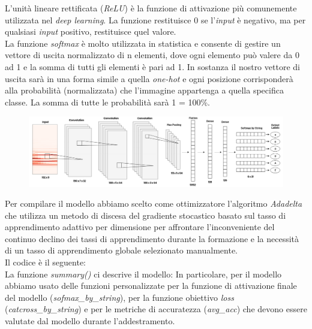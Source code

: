 L'unità lineare rettificata (\textit{ReLU}) è la funzione di attivazione più comunemente utilizzata nel \textit{deep learning}. La funzione restituisce 0 se l'\textit{input} è negativo, ma per qualsiasi \textit{input} positivo, restituisce quel valore.\\
La funzione \textit{softmax} è molto utilizzata in statistica e consente di gestire un vettore di uscita normalizzato di n elementi, dove ogni elemento può valere da 0 ad 1 e la somma di tutti gli elementi è pari ad 1. In sostanza il nostro vettore di uscita sarà in una forma simile a quella \textit{one-hot} e ogni posizione corrisponderà alla probabilità (normalizzata) che l’immagine appartenga a quella specifica classe. La somma di tutte le probabilità sarà 1 = 100\%.
\begin{figure}[H]
	\centering
	\includegraphics[scale=1.4]{./images/model.png}
\end{figure}
\noindent Per compilare il modello abbiamo scelto come ottimizzatore l'algoritmo \textit{Adadelta} che utilizza un metodo di discesa del gradiente stocastico basato sul tasso di apprendimento adattivo per dimensione per affrontare l'inconveniente del continuo declino dei tassi di apprendimento durante la formazione e la necessità di un tasso di apprendimento globale selezionato manualmente.\\
Il codice è il seguente:\\
\newline
\vspace*{2ex}
\vspace*{2ex}
\noindent La funzione \textit{summary()} ci descrive il modello:
\vspace*{2ex}
\vspace*{2ex}
\noindent In particolare, per il modello abbiamo usato delle funzioni personalizzate per la funzione di attivazione finale del modello (\textit{sofmax\_by\_string}), per la funzione obiettivo \textit{loss} (\textit{catcross\_by\_string}) e per le metriche di accuratezza (\textit{avg\_acc}) che devono essere valutate dal modello durante l'addestramento.\\
